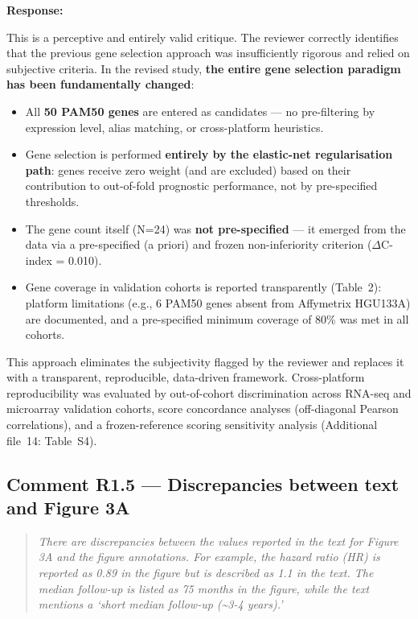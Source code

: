 \documentclass[11pt]{article}
\newcommand{\reviewerquote}[1]{\begin{quote}\itshape #1\end{quote}}
\begin{document}
\noindent\textbf{Response:}

This is a perceptive and entirely valid critique. The reviewer correctly identifies that the previous gene selection approach was insufficiently rigorous and relied on subjective criteria. In the revised study, \textbf{the entire gene selection paradigm has been fundamentally changed}:

\begin{itemize}
  \item All \textbf{50 PAM50 genes} are entered as candidates --- no pre-filtering by expression level, alias matching, or cross-platform heuristics.
  \item Gene selection is performed \textbf{entirely by the elastic-net regularisation path}: genes receive zero weight (and are excluded) based on their contribution to out-of-fold prognostic performance, not by pre-specified thresholds.
  \item The gene count itself (N=24) was \textbf{not pre-specified} --- it emerged from the data via a pre-specified (a priori) and frozen non-inferiority criterion ($\Delta$C-index = 0.010).
  \item Gene coverage in validation cohorts is reported transparently (Table~2): platform limitations (e.g., 6 PAM50 genes absent from Affymetrix HGU133A) are documented, and a pre-specified minimum coverage of 80\% was met in all cohorts.
\end{itemize}

This approach eliminates the subjectivity flagged by the reviewer and replaces it with a transparent, reproducible, data-driven framework. Cross-platform reproducibility was evaluated by out-of-cohort discrimination across RNA-seq and microarray validation cohorts, score concordance analyses (off-diagonal Pearson correlations), and a frozen-reference scoring sensitivity analysis (Additional file~14: Table~S4).

\subsection*{Comment R1.5 --- Discrepancies between text and Figure 3A}

\reviewerquote{There are discrepancies between the values reported in the text for Figure 3A and the figure annotations. For example, the hazard ratio (HR) is reported as 0.89 in the figure but is described as 1.1 in the text. The median follow-up is listed as 75 months in the figure, while the text mentions a `short median follow-up (\textasciitilde 3-4 years).'}
\end{document}
